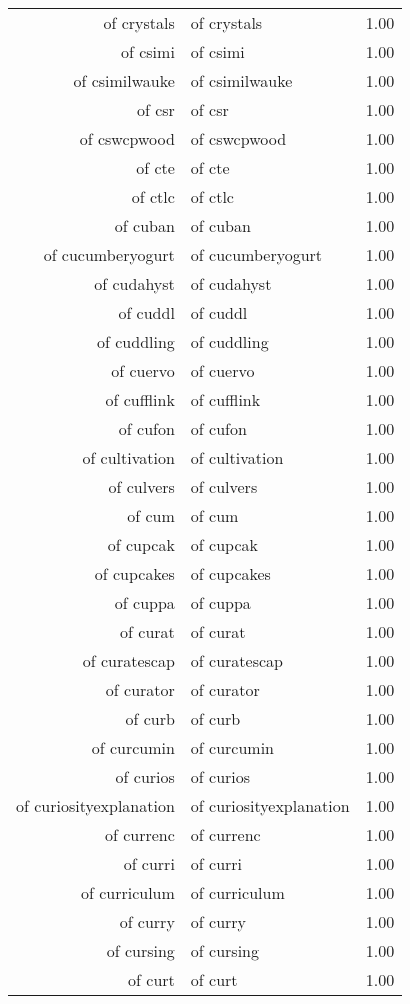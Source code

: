 \begin{table}[ht]
\begin{tabular}{rlr}
  of crystals & of crystals & 1.00 \\ 
  of csimi & of csimi & 1.00 \\ 
  of csimilwauke & of csimilwauke & 1.00 \\ 
  of csr & of csr & 1.00 \\ 
  of cswcpwood & of cswcpwood & 1.00 \\ 
  of cte & of cte & 1.00 \\ 
  of ctlc & of ctlc & 1.00 \\ 
  of cuban & of cuban & 1.00 \\ 
  of cucumberyogurt & of cucumberyogurt & 1.00 \\ 
  of cudahyst & of cudahyst & 1.00 \\ 
  of cuddl & of cuddl & 1.00 \\ 
  of cuddling & of cuddling & 1.00 \\ 
  of cuervo & of cuervo & 1.00 \\ 
  of cufflink & of cufflink & 1.00 \\ 
  of cufon & of cufon & 1.00 \\ 
  of cultivation & of cultivation & 1.00 \\ 
  of culvers & of culvers & 1.00 \\ 
  of cum & of cum & 1.00 \\ 
  of cupcak & of cupcak & 1.00 \\ 
  of cupcakes & of cupcakes & 1.00 \\ 
  of cuppa & of cuppa & 1.00 \\ 
  of curat & of curat & 1.00 \\ 
  of curatescap & of curatescap & 1.00 \\ 
  of curator & of curator & 1.00 \\ 
  of curb & of curb & 1.00 \\ 
  of curcumin & of curcumin & 1.00 \\ 
  of curios & of curios & 1.00 \\ 
  of curiosityexplanation & of curiosityexplanation & 1.00 \\ 
  of currenc & of currenc & 1.00 \\ 
  of curri & of curri & 1.00 \\ 
  of curriculum & of curriculum & 1.00 \\ 
  of curry & of curry & 1.00 \\ 
  of cursing & of cursing & 1.00 \\ 
  of curt & of curt & 1.00 \\ 

\end{tabular}
\end{table}
